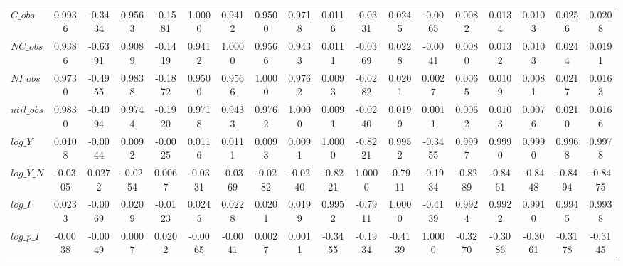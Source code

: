 \begin{center}
\begin{longtable}{lccccccccccccccccc}
$C\_obs     $	 & 	       0.9936	 & 	      -0.3434	 & 	       0.9563	 & 	      -0.1581	 & 	       1.0000	 & 	       0.9412	 & 	       0.9500	 & 	       0.9718	 & 	       0.0116	 & 	      -0.0331	 & 	       0.0245	 & 	      -0.0065	 & 	       0.0082	 & 	       0.0134	 & 	       0.0103	 & 	       0.0256	 & 	       0.0208 \\ 
$NC\_obs    $	 & 	       0.9386	 & 	      -0.6391	 & 	       0.9089	 & 	      -0.1419	 & 	       0.9412	 & 	       1.0000	 & 	       0.9566	 & 	       0.9433	 & 	       0.0111	 & 	      -0.0369	 & 	       0.0228	 & 	      -0.0041	 & 	       0.0080	 & 	       0.0132	 & 	       0.0103	 & 	       0.0244	 & 	       0.0191 \\ 
$NI\_obs    $	 & 	       0.9730	 & 	      -0.4955	 & 	       0.9838	 & 	      -0.1872	 & 	       0.9500	 & 	       0.9566	 & 	       1.0000	 & 	       0.9762	 & 	       0.0093	 & 	      -0.0282	 & 	       0.0201	 & 	       0.0027	 & 	       0.0065	 & 	       0.0109	 & 	       0.0081	 & 	       0.0217	 & 	       0.0163 \\ 
$util\_obs  $	 & 	       0.9830	 & 	      -0.4094	 & 	       0.9744	 & 	      -0.1920	 & 	       0.9718	 & 	       0.9433	 & 	       0.9762	 & 	       1.0000	 & 	       0.0091	 & 	      -0.0240	 & 	       0.0199	 & 	       0.0011	 & 	       0.0062	 & 	       0.0103	 & 	       0.0076	 & 	       0.0210	 & 	       0.0166 \\ 
$log\_Y     $	 & 	       0.0108	 & 	      -0.0044	 & 	       0.0092	 & 	      -0.0025	 & 	       0.0116	 & 	       0.0111	 & 	       0.0093	 & 	       0.0091	 & 	       1.0000	 & 	      -0.8221	 & 	       0.9952	 & 	      -0.3455	 & 	       0.9997	 & 	       0.9990	 & 	       0.9990	 & 	       0.9968	 & 	       0.9978 \\ 
$log\_Y\_N  $	 & 	      -0.0305	 & 	       0.0272	 & 	      -0.0254	 & 	       0.0067	 & 	      -0.0331	 & 	      -0.0369	 & 	      -0.0282	 & 	      -0.0240	 & 	      -0.8221	 & 	       1.0000	 & 	      -0.7911	 & 	      -0.1934	 & 	      -0.8289	 & 	      -0.8461	 & 	      -0.8448	 & 	      -0.8494	 & 	      -0.8475 \\ 
$log\_I     $	 & 	       0.0233	 & 	      -0.0069	 & 	       0.0209	 & 	      -0.0123	 & 	       0.0245	 & 	       0.0228	 & 	       0.0201	 & 	       0.0199	 & 	       0.9952	 & 	      -0.7911	 & 	       1.0000	 & 	      -0.4139	 & 	       0.9924	 & 	       0.9922	 & 	       0.9910	 & 	       0.9945	 & 	       0.9938 \\ 
$log\_p\_I  $	 & 	      -0.0038	 & 	      -0.0049	 & 	       0.0007	 & 	       0.0202	 & 	      -0.0065	 & 	      -0.0041	 & 	       0.0027	 & 	       0.0011	 & 	      -0.3455	 & 	      -0.1934	 & 	      -0.4139	 & 	       1.0000	 & 	      -0.3270	 & 	      -0.3086	 & 	      -0.3061	 & 	      -0.3178	 & 	      -0.3145 \\ 

\end{longtable}
\end{center}
